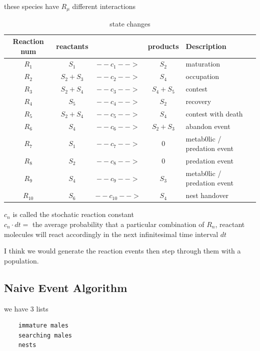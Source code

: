 \documentclass[a4paper,11pt]{article}
\begin{document}
these species have $R_\mu$ different interactions
\begin{table}[h!]
    \caption{state changes}
    \centering
    \begin{tabular}{c | c | c | c | l }
        \hline
        Reaction num & reactants  & & products & Description\\
        \hline
        \hline
            $R_1$       &   $S_1$       & $--c_1-->$      &   $ S_2$      & maturation\\
            $R_2$       &   $S_2 + S_3$ & $--c_2-->$      &   $S_4 $      & occupation\\
            $R_3$       &   $S_2 + S_4$ & $--c_3-->$      &   $S_4 + S_5$ & contest\\
            $R_4$       &   $S_5$       & $--c_4-->$      &   $S_2$       & recovery\\
            $R_5$       &   $S_2 + S_4$ & $--c_5-->$      &   $S_4$       & contest with death\\
            $R_6$       &   $S_4$       & $--c_6-->$      &   $S_2 + S_3$ & abandon event\\
            $R_7$       &   $S_1$       & $--c_7-->$      &   $0$         & metab0lic / predation event\\
            $R_8$       &   $S_2$       & $--c_8-->$      &   $0$         & predation event\\
            $R_9$       &   $S_4$       & $--c_9-->$      &   $S_3$       & metab0lic / predation event\\
            $R_{10}$    &   $S_6$       & $--c_{10}-->$   &   $S_4$       & nest handover\\
        \hline
    \end{tabular}

\end{table}

$c_n$ is called the stochatic reaction constant\\
$c_n \cdot dt = $ the average probability that a particular combination of $R_n$, reactant molecules will react accordingly in the next infinitesimal time interval $dt$


\citep{Gillespie-1976}
I think we would generate the reaction events then step through them with a population.

\clearpage
\subsection{Naive Event Algorithm}
we have 3 lists
\begin{verbatim}
    immature males
    searching males
    nests
\end{verbatim}
\end{document}
